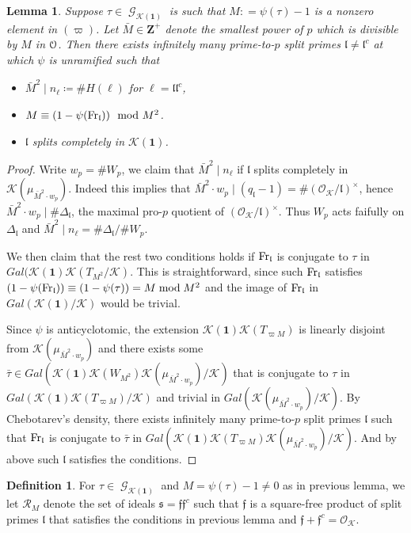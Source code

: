\documentclass[leqno]{amsart}
\newtheorem{lem}[thm]{Lemma}
\theoremstyle{definition}
\newtheorem{defn}[thm]{Definition}
\theoremstyle{remark}
\newcommand{\id}{\mathbf{1}}
\newcommand{\oo}{\mathcal{O}}
\newcommand{\eo}{\EuScript{O}}
\newcommand{\Z}{{\mathbf{Z}}}
\DeclareMathOperator{\Gal}{\mathcal{G}}
\newcommand{\Fr}{\textnormal{Fr}} %
\newcommand{\ff}{\mathfrak{f}}
\newcommand{\fl}{\mathfrak{l}}
\newcommand{\fs}{\mathfrak{s}}
\newcommand{\K}{{\mathcal{K}}} %
\begin{document}
\begin{lem}\label{lem:estimate}
Suppose $\tau\in \Gal_{\K(\id)}$ is such that 
$M\colon=\psi(\tau)-1$ is a nonzero element in $(\varpi)$.
Let $\bar{M}\in\Z^+$
denote the smallest power of $p$
which is divisible by $M$ in $\eo$.
Then there exists infinitely many 
prime-to-$p$ split primes $\fl\neq\fl^c$
at which $\psi$ is unramified
such that 
\begin{itemize}
\item $\bar{M}^2\mid n_\ell\coloneqq \#H(\ell)$ for $\ell=\fl\fl^c$,
\item $M\equiv (1-\psi(\Fr_\fl))\mod M^2$.
\item $\fl$ splits completely in $\K(\id)$.
\end{itemize}
\end{lem}
\begin{proof}
Write $w_p=\#W_p$,
we claim that $\bar{M}^2\mid n_\ell$
if $\fl$ splits completely in 
$\K(\mu_{\bar{M}^2\cdot w_p})$.
Indeed this implies that 
$\bar{M}^2\cdot w_p\mid (q_\fl-1)=\#(\oo_\K/\fl)^\times$,
hence $\bar{M}^2\cdot w_p\mid \#\Delta_\fl$,
the maximal pro-$p$ quotient of $(\oo_\K/\fl)^\times$.
Thus $W_p$ acts faifully on $\Delta_\fl$
and $\bar{M}^2\mid n_\ell=\#\Delta_\fl/\#W_p$.

We then claim that 
the rest two conditions holds if
$\Fr_\fl$ is conjugate to $\tau$
in $Gal(\K(\id)\K(T_{M^2}/\K)$.
This is straightforward, 
since such $\Fr_\fl$ satisfies
$(1-\psi(\Fr_\fl))\equiv (1-\psi(\tau))=M\bmod M^2$
and the image of $\Fr_\fl$
in $Gal(\K(\id)/\K)$ would be trivial.

Since $\psi$ is anticyclotomic,
the extension $\K(\id)\K(T_{\varpi M})$
is linearly disjoint from 
$\K(\mu_{\bar{M}^2\cdot w_p})$
and there exists some $\bar{\tau}\in 
Gal(\K(\id)\K(W_{M^2})\K(\mu_{\bar{M}^2\cdot w_p})/\K)$
that is conjugate to $\tau$ in 
$Gal(\K(\id)\K(T_{\varpi M})/\K)$
and trivial in 
$Gal(\K(\mu_{\bar{M}^2\cdot w_p})/\K)$.
By Chebotarev's density,
there exists infinitely many prime-to-$p$
split primes $\fl$ such that
$\Fr_\fl$ is conjugate to $\bar{\tau}$ in
$Gal(\K(\id)\K(T_{\varpi M})\K(\mu_{\bar{M}^2\cdot w_p})/\K)$.
And by above such $\fl$ satisfies the conditions.
    
\end{proof}

\begin{defn}\label{def:RM}
For $\tau\in\Gal_{\K(\id)}$
and $M=\psi(\tau)-1\neq 0$ 
as in previous lemma, 
we let $\mathcal{R}_M$
denote the set of ideals $\fs=\ff\ff^c$
such that $\ff$ is a
square-free product of
split primes $\fl$ that satisfies the conditions
in previous lemma
and $\ff+\ff^c=\oo_\K$.
\end{defn}
\end{document}
